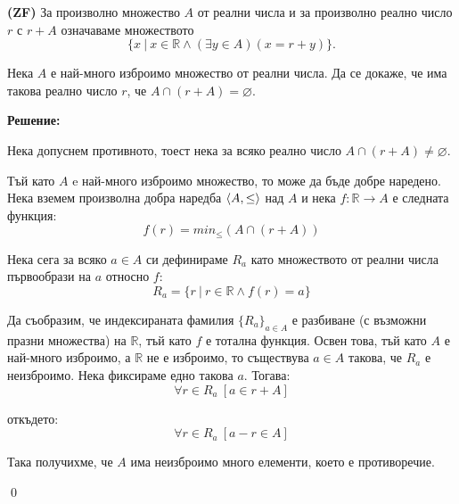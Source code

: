 \begin{problem}
\textbf{(ZF)}
За произволно множество $A$ от реални числа и за произволно реално число $r$ с $r + A$ означаваме множеството
\[
\{x\ |\ x \in \mathbb{R} \land (\exists y \in A)(x = r + y)\}.
\]

\quad
Нека $A$ е най-много изброимо множество от реални числа.
Да се докаже, че има такова реално число $r$, че $A \cap (r+A) = \varnothing$.
\end{problem}

\textbf{Решение:}

\smallbreak
\quad
Нека допуснем противното, тоест нека за всяко реално число $A \cap (r + A) \neq \varnothing$.

\quad
Тъй като $A$ e най-много изброимо множество, то може да бъде добре наредено.
Нека вземем произволна добра наредба $\langle A, \leq \rangle$ над $A$ и нека
$f: \mathbb{R} \to A$ е следната функция:
\[
f(r) = min_{\leq}(A \cap (r + A))
\]

\quad
Нека сега за всяко $a \in A$ си дефинираме $R_a$ като множеството от реални числа първообрази на $a$ относно $f$:
\[
R_a = \{r\ |\ r \in \mathbb{R} \land f(r) = a \}
\]

\quad
Да съобразим, че индексираната фамилия $\{R_a\}_{a \in A}$ е разбиване (с възможни празни множества) на $\mathbb{R}$,
тъй като $f$ е тотална функция.
Освен това, тъй като $A$ е най-много изброимо, а $\mathbb{R}$ не е изброимо,
то съществува $a \in A$ такова, че $R_a$ е неизброимо.
Нека фиксираме едно такова $a$. Тогава:
\[
\forall r \in R_a\ [a \in r + A]
\]

\quad
откъдето:
\[
\forall r \in R_a\ [a - r  \in A]
\]

\quad
Така получихме, че $A$ има неизброимо много елементи, което е противоречие.

\qed


